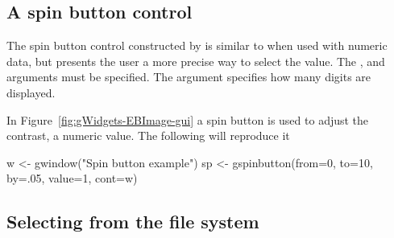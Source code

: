 \subsection{A spin button control}
\label{sec:gWidgets-spin-button-control}

The spin button control constructed by  is
similar to  when used with numeric data, but
presents the user a more precise way to select the value. The
,  and  arguments must be specified. The
argument  specifies how many digits are
displayed.

In Figure~\ref{fig:gWidgets-EBImage-gui} a spin button is used to
adjust the contrast, a numeric value. The following will reproduce it

\begin{Schunk}
\begin{Sinput}
 w <- gwindow("Spin button example")
 sp <- gspinbutton(from=0, to=10, by=.05, value=1, cont=w)
\end{Sinput}
\end{Schunk}







\subsection{Selecting from the file system}
\label{sec:gWidgets-selecting-from-file}

